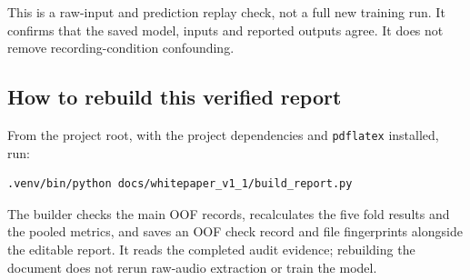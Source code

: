 \documentclass[11pt,a4paper]{article}
\begin{document}
This is a raw-input and prediction replay check, not a full new training run.
It confirms that the saved model, inputs and reported outputs agree. It does
not remove recording-condition confounding.

\subsection*{How to rebuild this verified report}
From the project root, with the project dependencies and \texttt{pdflatex}
installed, run:
{\small
\begin{verbatim}
.venv/bin/python docs/whitepaper_v1_1/build_report.py
\end{verbatim}
}
The builder checks the main OOF records, recalculates the five fold results and
the pooled metrics, and saves an OOF check record and file fingerprints alongside
the editable report. It reads the completed audit evidence; rebuilding the
document does not rerun raw-audio extraction or train the model.

\clearpage
\end{document}
